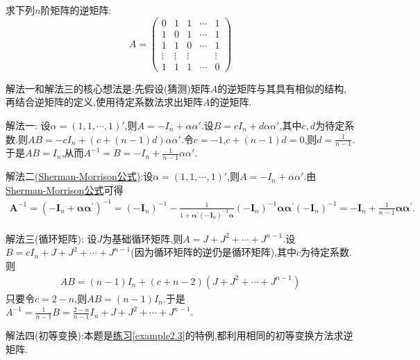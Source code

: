 \documentclass[../../main.tex]{subfiles}%
\begin{document}
\begin{example}
求下列\(n\)阶矩阵的逆矩阵:
\[
A = 
\begin{pmatrix}
0 & 1 & 1 & \cdots & 1 \\
1 & 0 & 1 & \cdots & 1 \\
1 & 1 & 0 & \cdots & 1 \\
\vdots & \vdots & \vdots & & \vdots \\
1 & 1 & 1 & \cdots & 0
\end{pmatrix}
\]    
\end{example}
\begin{note}
解法一和解法三的核心想法是:先假设(猜测)矩阵$A$的逆矩阵与其具有相似的结构,再结合逆矩阵的定义,使用待定系数法求出矩阵$A$的逆矩阵.
\end{note}
\begin{solution}

{\color{blue}解法一:}
设\(\alpha = (1,1,\cdots,1)'\),则\(A = -I_n + \alpha\alpha'\).设\(B = cI_n + d\alpha\alpha'\),其中\(c,d\)为待定系数.则\(AB = -cI_n + (c + (n - 1)d)\alpha\alpha'\).令\(c = -1\),\(c + (n - 1)d = 0\),则\(d = \frac{1}{n - 1}\).于是\(AB = I_n\),从而\(A^{-1} = B = -I_n + \frac{1}{n - 1}\alpha\alpha'\).

{\color{blue}解法二\hyperref[Sherman-Morrison公式]{(Sherman-Morrison公式)}:}设\(\alpha = (1,1,\cdots,1)'\),则\(A = -I_n + \alpha\alpha'\).由\hyperref[Sherman-Morrison公式]{Sherman-Morrison公式}可得
\begin{align*}
\boldsymbol{A}^{-1}=\left( -\boldsymbol{I}_n+\boldsymbol{\alpha \alpha }^{\prime} \right) ^{-1}=\left( -\boldsymbol{I}_n \right) ^{-1}-\frac{1}{1+\boldsymbol{\alpha }^{\prime}\left( -\boldsymbol{I}_n \right) ^{-1}\boldsymbol{\alpha }}\left( -\boldsymbol{I}_n \right) ^{-1}\boldsymbol{\alpha \alpha }^{\prime}\left( -\boldsymbol{I}_n \right) ^{-1}=-\boldsymbol{I}_n+\frac{1}{n-1}\boldsymbol{\alpha \alpha }^{\prime}.
\end{align*}

{\color{blue}解法三(循环矩阵):}
设\(J\)为基础循环矩阵,则\(A = J + J^2 + \cdots + J^{n - 1}\).设\(B = cI_n + J + J^2 + \cdots + J^{n - 1}\)(因为循环矩阵的逆仍是循环矩阵),其中\(c\)为待定系数.则
\begin{align*}
AB = (n - 1)I_n + (c + n - 2)(J + J^2 + \cdots + J^{n - 1}) 
\end{align*}
只要令\(c = 2 - n\),则\(AB = (n - 1)I_n\).于是\(A^{-1} = \frac{1}{n - 1}B = \frac{2 - n}{n - 1}I_n + J + J^2 + \cdots + J^{n - 1}\).

{\color{blue}解法四(初等变换):}本题是\hyperref[example2.3]{练习\ref{example2.3}}的特例,都利用相同的初等变换方法求逆矩阵.

\end{solution}
\end{document}
